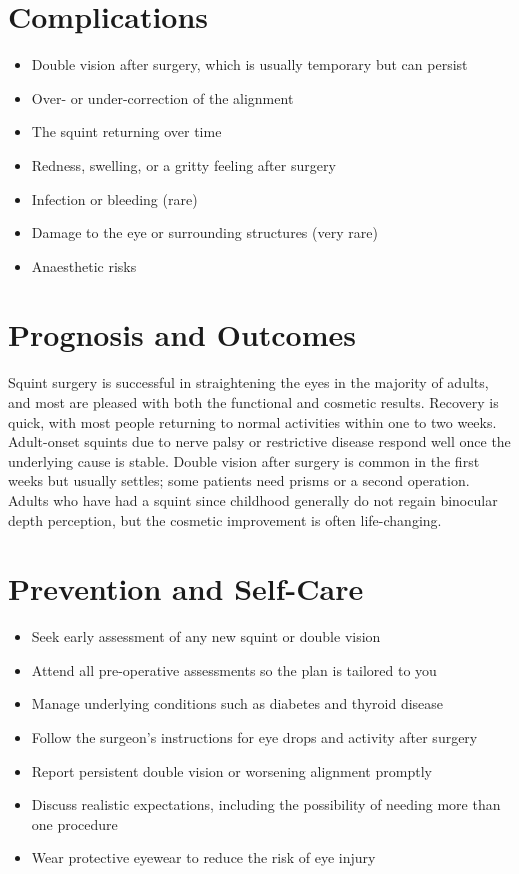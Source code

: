 \section*{Complications}
\begin{itemize}
    \item Double vision after surgery, which is usually temporary but can persist
    \item Over- or under-correction of the alignment
    \item The squint returning over time
    \item Redness, swelling, or a gritty feeling after surgery
    \item Infection or bleeding (rare)
    \item Damage to the eye or surrounding structures (very rare)
    \item Anaesthetic risks
\end{itemize}

\section*{Prognosis and Outcomes}
Squint surgery is successful in straightening the eyes in the majority of adults, and most are pleased with both the functional and cosmetic results. Recovery is quick, with most people returning to normal activities within one to two weeks. Adult-onset squints due to nerve palsy or restrictive disease respond well once the underlying cause is stable. Double vision after surgery is common in the first weeks but usually settles; some patients need prisms or a second operation. Adults who have had a squint since childhood generally do not regain binocular depth perception, but the cosmetic improvement is often life-changing.

\section*{Prevention and Self-Care}
\begin{itemize}
    \item Seek early assessment of any new squint or double vision
    \item Attend all pre-operative assessments so the plan is tailored to you
    \item Manage underlying conditions such as diabetes and thyroid disease
    \item Follow the surgeon's instructions for eye drops and activity after surgery
    \item Report persistent double vision or worsening alignment promptly
    \item Discuss realistic expectations, including the possibility of needing more than one procedure
    \item Wear protective eyewear to reduce the risk of eye injury
\end{itemize}

